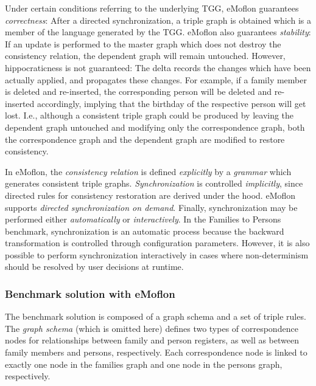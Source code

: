 Under certain conditions referring to the underlying TGG, eMoflon guarantees \emph{correctness}: After a directed synchronization, a triple graph is obtained which is a member of the language generated by the TGG. eMoflon also guarantees \emph{stability}: If an update is performed to the master graph which does not destroy the consistency relation, the dependent graph will remain untouched. However, hippocraticness is not guaranteed: The delta records the changes which have been actually applied, and propagates these changes. For example, if a family member is deleted and re-inserted, the corresponding person will be deleted and re-inserted accordingly, implying that the birthday of the respective person will get lost. I.e., although a consistent triple graph could be produced by leaving the dependent graph untouched and modifying only the correspondence graph, both the correspondence graph and the dependent graph are modified to restore consistency. 

In eMoflon, the \emph{consistency relation} is defined \emph{explicitly} by a \emph{grammar} which generates consistent triple graphs. \emph{Synchronization} is controlled \emph{implicitly}, since directed rules for consistency restoration are derived under the hood. eMoflon supports \emph{directed synchronization on demand}. Finally, synchronization may be performed either \emph{automatically} or \emph{interactively}. In the Families to Persons benchmark, synchronization is an automatic process because the backward transformation is controlled through configuration parameters. However, it is also possible to perform synchronization interactively in cases where non-determinism should be resolved by user decisions at runtime.

\subsubsection{Benchmark solution with eMoflon}
\label{sec:solutionEMoflon}


The benchmark solution is composed of a graph schema and a set of triple rules. The \emph{graph schema} (which is omitted here) defines two types of correspondence nodes for relationships between family and person registers, as well as between family members and persons, respectively. Each correspondence node is linked to exactly one node in the families graph and one node in the persons graph, respectively.

